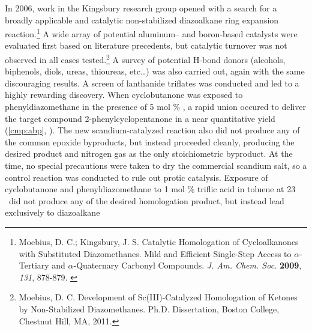 In 2006, work in the Kingsbury research group opened with a search for a broadly applicable and
catalytic non-stabilized diazoalkane ring expansion reaction.\footnote{{\frenchspacing Moebius, D.
C.; Kingsbury, J. S. Catalytic Homologation of Cycloalkanones with Substituted Diazomethanes. Mild
and Efficient Single-Step Access to $\alpha$-Tertiary and $\alpha$-Quaternary Carbonyl Compounds.
\textit{J. Am. Chem. Soc.} \textbf{2009}, \textit{131}, 878-879.} \label{ref:moebius}} A wide array
of potential aluminum-- and boron-based catalysts were evaluated first based on literature
precedents, but catalytic turnover was not observed in all cases
tested.\footnote{{\frenchspacing Moebius, D.
C.
Development of Sc(III)-Catalyzed Homologation of Ketones by Non-Stabilized Diazomethanes. Ph.D.
Dissertation, Boston College, Chestnut Hill, MA, 2011.}} A survey of potential H-bond donors
(alcohols, biphenols, diols, ureas, thioureas, etc\ldots) was also carried out, again with the same
discouraging results. A screen of lanthanide triflates was conducted and led to a highly rewarding
discovery. When cyclobutanone was exposed to phenyldiazomethane in the presence of 5 mol \%
, a rapid union occured to deliver the target compound 2-phenylcyclopentanone in a near
quantitative yield (\ce{->}\ref{cmp:abp}, ). The new scandium-catalyzed reaction
also did not produce any of the common epoxide byproducts, but instead proceeded cleanly, producing
the desired product and nitrogen gas as the only stoichiometric byproduct.
At the time, no special precautions were taken to dry the commercial scandium salt, so a control
reaction was conducted to rule out protic catalysis. Exposure of cyclobutanone and
phenyldiazomethane to 1 mol \% triflic acid in toluene at 23 \degc\ did not produce any of the
desired homologation product, but instead lead exclusively to diazoalkane
